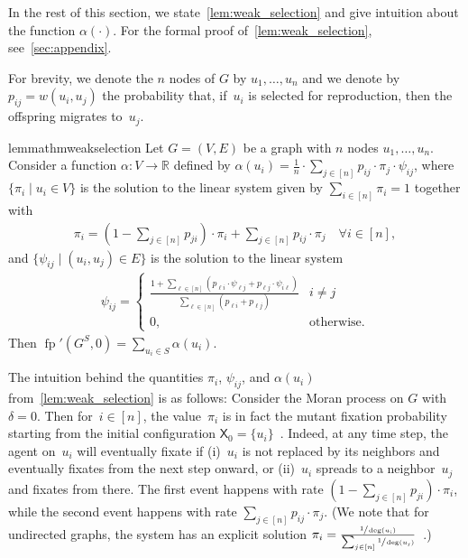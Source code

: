 \documentclass[letterpaper]{article}
\def\R{\mathbb{R}}
\newcommand{\X}{\mathsf{X}}
\newcommand{\fp}{\operatorname{fp}}
\newcommand{\FitAdv}{\delta}
\newcommand{\Weight}{w}
\begin{document}
In the rest of this section, we state~\cref{lem:weak_selection}
and give intuition about the function $\alpha(\cdot)$.
For the formal proof of~\cref{lem:weak_selection}, see~\cref{sec:appendix}. %

For brevity, we denote the $n$ nodes of $G$ by $u_1,\dots,u_n$
and we denote by~$p_{ij}=\Weight(u_i, u_j)$ the probability that,
if~$u_i$ is selected for reproduction, then the offspring migrates to~$u_j$.

\begin{restatable}{lemma}{thmweakselection}\label{lem:weak_selection}
Let $G=(V,E)$ be a graph with $n$ nodes $u_1,\dots,u_n$. %
Consider a function $\alpha\colon V\to\R$ defined by $\alpha(u_i) =  \frac{1}{n}\cdot \sum_{j\in[n]} p_{ij} \cdot \pi_j\cdot \psi_{ij}$,
where $\{\pi_i\mid u_i\in V\}$ is the solution to the linear system
given by $\sum_{i\in [n]} \pi_i=1$ together with
\begin{align}
\pi_i= \left(1-\sum_{j\in[n]} p_{ji}\right)\cdot \pi_i +\sum_{j\in[n]} p_{ij}\cdot \pi_j\quad\forall i\in[n],
\label{eq:pi2}
\end{align}
and $\{\psi_{ij} \mid (u_i,u_j)\in E\}$ is the solution to the linear system
\begin{align}
\psi_{ij}=
\begin{cases}
\frac{1+\sum_{\ell\in[n]}\left(p_{\ell i}\cdot \psi_{\ell j} + p_{\ell j}\cdot \psi_{i\ell}\right)}{\sum_{\ell\in[n]}\left(p_{\ell i}+p_{\ell j}\right)} & i\neq j %
\\
0, & \text{otherwise}.
\end{cases}
\label{eq:psi}
\end{align}
Then $\fp'(G^S,0)=\sum_{u_i\in S} \alpha(u_i)$.
\end{restatable}

The intuition behind the quantities $\pi_i$, $\psi_{ij}$, and $\alpha(u_i)$ from~\cref{lem:weak_selection} is as follows:
Consider the Moran process on $G$ with $\FitAdv=0$.
Then for~$i\in[n]$, the value~$\pi_i$ is in fact the mutant fixation probability
starting from the initial configuration $\X_0=\{u_i\}$~\cite{Allen2021}.
Indeed, at any time step, the agent on~$u_i$ will eventually fixate if
(i)~$u_i$ is not replaced by its neighbors and eventually fixates from the next step onward, or
(ii)~$u_i$ spreads to a neighbor~$u_j$ and fixates from there.
The first event happens with rate $(1-\sum_{j\in[n]}p_{ji})\cdot\pi_i $,
while the second event happens with rate $\sum_{j\in[n]} p_{ij}\cdot \pi_j$.
(We note that for undirected graphs, the system has an explicit solution
$\pi_i = \frac{\sfrac{1}{\deg(u_i)}}{\sum_{j\in[n]}\sfrac{1}{\deg(u_j)}}$~\cite{Broom2010}.)
\end{document}
